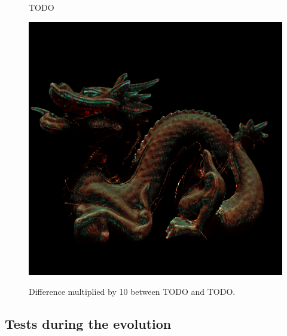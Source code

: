 \begin{figure}
{}
\label{fig:pathdragonsize}
\caption{TODO}
\end{figure}

\begin{figure}
\centering
  \includegraphics[width=1 \linewidth]{images/results/difference.png}
\label{fig:pathdragon}
\caption{Difference multiplied by 10 between TODO and TODO.}
\end{figure}

\FloatBarrier
\subsection{Tests during the evolution}

